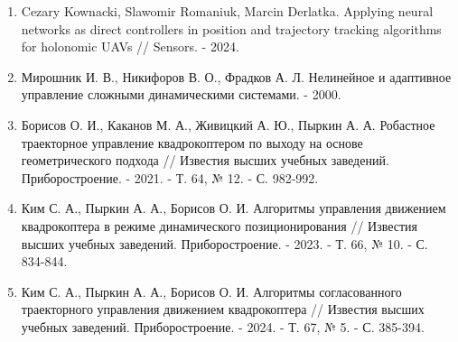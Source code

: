 \begin{enumerate}
    \item Cezary Kownacki, Slawomir Romaniuk, Marcin Derlatka. Applying neural networks as direct controllers in position and trajectory tracking algorithms for holonomic UAVs //
    Sensors. - 2024.
    \item Мирошник И. В., Никифоров В. О., Фрадков А. Л. Нелинейное и адаптивное управление сложными динамическими системами. - 2000.
    \item Борисов О. И., Каканов М. А., Живицкий А. Ю., Пыркин А. А. Робастное траекторное управление квадрокоптером по выходу на основе геометрического подхода // Известия высших учебных заведений. Приборостроение. - 2021. - Т. 64, № 12. - С. 982-992.
    \item Ким С. А., Пыркин А. А., Борисов О. И. Алгоритмы управления движением квадрокоптера в режиме динамического позиционирования // Известия высших учебных заведений. Приборостроение. - 2023. - Т. 66, № 10. - С. 834-844.
    \item Ким С. А., Пыркин А. А., Борисов О. И. Алгоритмы согласованного траекторного управления движением квадрокоптера // Известия высших учебных заведений. Приборостроение. - 2024. - Т. 67, № 5. - С. 385-394.


\end{enumerate}